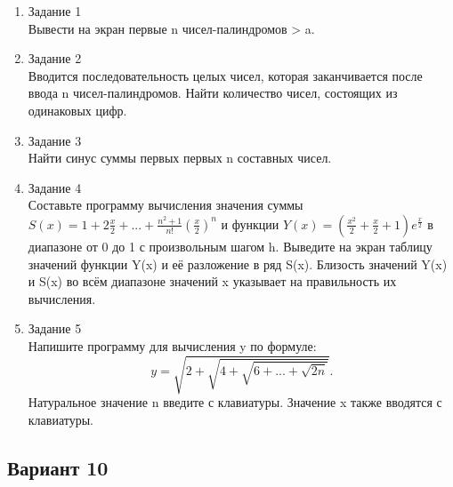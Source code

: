 \documentclass[a4paper]{article}
\begin{document}
	
	\begin{enumerate} 
		\item Задание 1 \\
		Вывести на экран первые n чисел-палиндромов > a.\\
		\item Задание 2\\
		Вводится последовательность целых чисел, которая заканчивается после ввода n чисел-палиндромов. 
		Найти количество чисел, состоящих из одинаковых цифр.\\
		\item Задание 3 \\
		Найти синус суммы первых первых n составных чисел.\\
		\item Задание 4 \\ 
		Составьте программу вычисления значения суммы  $S(x)=1+2\frac{x}{2}+...+\frac{n^2+1}{n!}{(\frac{x}{2})^n}$
		и функции $Y(x)=(\frac{x^2}{2}+\frac{x}{2}+1)e^{\frac{x}{2}}$ в диапазоне от 0 до 1
		с произвольным шагом h. Выведите на экран таблицу значений функции Y(x) и её разложение в ряд S(x). Близость значений Y(x) и S(x) во всём диапазоне
		значений x указывает на правильность их вычисления.\\
		\item Задание 5 \\
		Напишите программу для вычисления y по формуле:\\
		$$y=\sqrt{2+\sqrt{4+\sqrt{6+...+\sqrt{2n}}}}.$$
		Натуральное значение n введите с клавиатуры. Значение x также вводятся с клавиатуры.\\
	\end{enumerate}

	\begin{center}
		\subsection*{Вариант 10}
	\end{center}
	
\end{document}
